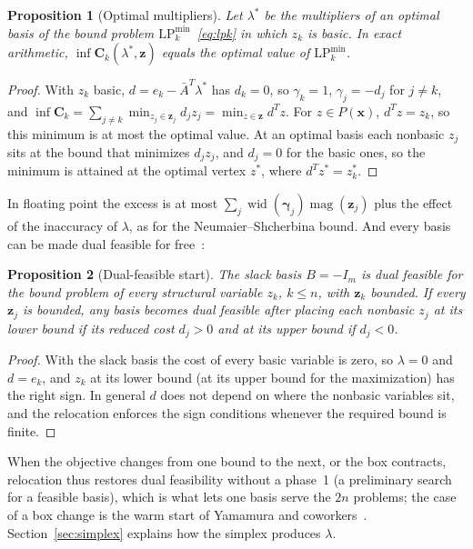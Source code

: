 \documentclass[11pt]{article}
\newcommand{\iv}[1]{\mathbf{#1}}          %
\newcommand{\Abar}{\bar{A}}
\newcommand{\inff}{\operatorname{inf}}
\newcommand{\wid}{\operatorname{wid}}
\newcommand{\magn}{\operatorname{mag}}
\newtheorem{proposition}{Proposition}
\theoremstyle{definition}
\theoremstyle{remark}
\begin{document}
\begin{proposition}[Optimal multipliers]\label{prop:opt}
Let $\lambda^*$ be the multipliers of an optimal basis of the bound problem
$\mathrm{LP}_k^{\min}$~\eqref{eq:lpk} in which $z_k$ is basic. In exact
arithmetic, $\inff\iv{C}_k(\lambda^*,\iv{z})$ equals the optimal value of
$\mathrm{LP}_k^{\min}$.
\end{proposition}
\begin{proof}
With $z_k$ basic, $d=e_k-\Abar^T\lambda^*$ has $d_k=0$, so $\gamma_k=1$,
$\gamma_j=-d_j$ for $j\neq k$, and
$\inff\iv{C}_k=\sum_{j\neq k}\min_{z_j\in\iv{z}_j}d_jz_j=\min_{z\in\iv{z}}d^Tz$.
For $z\in P(\iv{x})$, $d^Tz=z_k$, so this minimum is at most the optimal value.
At an optimal basis each nonbasic $z_j$ sits at the bound that minimizes
$d_jz_j$, and $d_j=0$ for the basic ones, so the minimum is attained at the
optimal vertex $z^*$, where $d^Tz^*=z^*_k$.
\end{proof}

In floating point the excess is at most
$\sum_j\wid(\iv{\gamma}_j)\magn(\iv{z}_j)$ plus the effect of the inaccuracy
of $\lambda$, as for the Neumaier--Shcherbina bound. And every basis can be
made dual feasible for free~\cite{koberstein2005dual}:

\begin{proposition}[Dual-feasible start]\label{prop:start}
The slack basis $B=-I_m$ is dual feasible for the bound problem of every
structural variable $z_k$, $k\le n$, with $\iv{z}_k$ bounded. If every
$\iv{z}_j$ is bounded, any basis becomes dual feasible after placing each
nonbasic $z_j$ at its lower bound if its reduced cost $d_j>0$ and at its upper
bound if $d_j<0$.
\end{proposition}
\begin{proof}
With the slack basis the cost of every basic variable is zero, so $\lambda=0$
and $d=e_k$, and $z_k$ at its lower bound (at its upper bound for the maximization) has
the right sign. In general $d$
does not depend on where the nonbasic variables sit, and the relocation
enforces the sign conditions whenever the required bound is finite.
\end{proof}

When the objective changes from one bound to the next, or the box contracts,
relocation thus restores dual feasibility without a phase~1 (a preliminary
search for a feasible basis), which is what
lets one basis serve the $2n$ problems; the case of a box change is the warm
start of Yamamura and coworkers~\cite{yamamura2001dual,yamamura2006dual}.
Section~\ref{sec:simplex} explains how the simplex produces $\lambda$.
\end{document}

